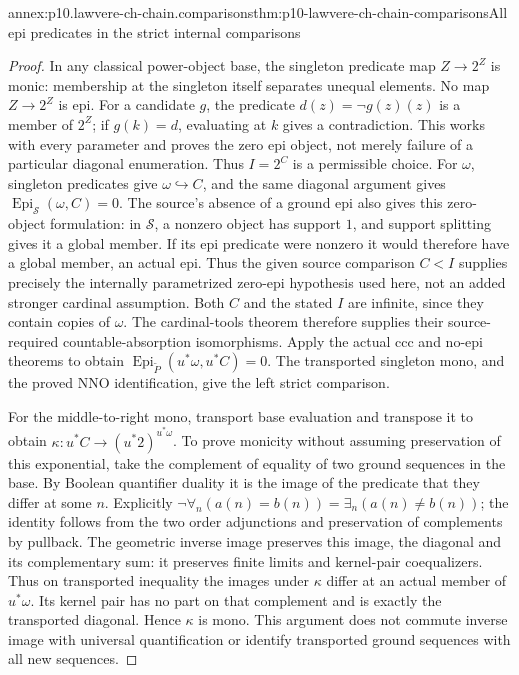 \begin{annexitem}{annex:p10.lawvere-ch-chain.comparisons}{thm:p10-lawvere-ch-chain-comparisons}{All epi predicates in the strict internal comparisons}
\begin{proof}
In any classical power-object base, the singleton predicate map
\(Z\to2^Z\) is monic: membership at the singleton itself separates
unequal elements. No map \(Z\to2^Z\) is epi. For a candidate \(g\),
the predicate \(d(z)=\neg g(z)(z)\) is a member of \(2^Z\);
if \(g(k)=d\), evaluating at \(k\) gives a contradiction.
This works with every parameter and proves the zero epi object,
not merely failure of a particular diagonal enumeration.
Thus \(I=2^C\) is a permissible choice. For \(\omega\), singleton
predicates give \(\omega\hookrightarrow C\), and the same diagonal
argument gives \(\operatorname{Epi}_{\mathcal S}(\omega,C)=0\).
The source's absence of a ground epi also gives this zero-object
formulation: in \(\mathcal S\), a nonzero object has support \(1\),
and support splitting gives it a global member. If its epi predicate
were nonzero it would therefore have a global member, an actual epi.
Thus the given source comparison \(C<I\) supplies precisely the
internally parametrized zero-epi hypothesis used here, not an added
stronger cardinal assumption.
Both \(C\) and the stated \(I\) are infinite, since they contain
copies of \(\omega\). The cardinal-tools theorem therefore supplies
their source-required countable-absorption isomorphisms.
Apply the actual ccc and no-epi theorems to obtain
\(\operatorname{Epi}_{\widetilde P}(u^*\omega,u^*C)=0\).
The transported singleton mono, and the proved NNO identification,
give the left strict comparison.

For the middle-to-right mono, transport base evaluation and transpose
it to obtain \(\kappa:u^*C\to(u^*2)^{u^*\omega}\).
To prove monicity without assuming preservation of this exponential,
take the complement of equality of two ground sequences in the base.
By Boolean quantifier duality it is the image of the predicate that
they differ at some \(n\). Explicitly
\(\neg\forall_n(a(n)=b(n))=\exists_n(a(n)\ne b(n))\);
the identity follows from the two order adjunctions and preservation
of complements by pullback. The geometric inverse image preserves
this image, the diagonal and its complementary sum: it preserves
finite limits and kernel-pair coequalizers. Thus on transported
inequality the images under \(\kappa\) differ at an actual member
of \(u^*\omega\). Its kernel pair has no part on that complement
and is exactly the transported diagonal. Hence \(\kappa\) is mono.
This argument does not commute inverse image with universal quantification
or identify transported ground sequences with all new sequences.


\end{proof}
\end{annexitem}
